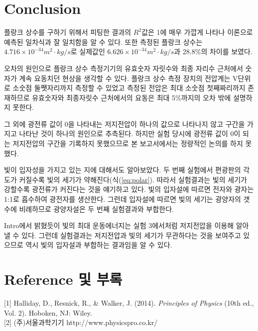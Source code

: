 \documentclass[a4paper]{article}
\begin{document}
	\section{Conclusion}
	플랑크 상수를 구하기 위해서 피팅한 결과의 $R^2$값은 1에 매우 가깝게 나타나 이론으로 예측된 일차식과 잘 일치함을 알 수 있다.
	또한 측정된 플랑크 상수는 $4.716 \times 10^{-34} \si{m^2 \cdot kg /s}$로 실제값인 $6.626 \times 10^{-34} \si{m^2 \cdot kg /s}$과 28.8\%의 차이를 보였다. 

	오차의 원인으로 플랑크 상수 측정기기의 유효숫자 자릿수와 최종 자리수 근처에서 숫자가 계속 요동치던 현상을 생각할 수 있다.
	플랑크 상수 측정 장치의 전압계는 V단위로 소숫점 둘쨋자리까지 측정할 수 있었고 측정된 전압은 최대 소숫점 첫째짜리까지 존재하므로 유효숫자와 최종자릿수 근처에서의 요동은 최대 5\%까지의 오차 밖에 설명하지 못한다.

	그 외에 광전류 값이 0을 나타내는 저지전압이 하나의 값으로 나타나지 않고 구간을 가지고 나타난 것이 하나의 원인으로 추측된다.
	하지만 실험 당시에 광전류 값이 0이 되는 저지전압의 구간을 기록하지 못했으므로 본 보고서에서는 정량적인 논의를 하지 못했다.

	빛이 입자성을 가지고 있는 지에 대해서도 알아보았다.
	두 번째 실험에서 편광판의 각도가 커질수록 빛의 세기가 약해진다(식(\ref{eq:polar}).
	따라서 실험결과는 빛의 세기가 강할수록 광전류가 커진다는 것을 얘기하고 있다.
	빛의 입자설에 따르면 전자와 광자는 1:1로 흡수하여 광전자를 생산한다.
	그런데 입자설에 따르면 빛의 세기는 광양자의 갯수에 비례하므로 광양자설은 두 번째 실험결과와 부합한다.

	Intro에서 밝혔듯이 빛의 최대 운동에너지는 실험 3에서처럼 저지전압을 이용해 알아낼 수 있다.
	그런데 실험결과는 저지전압과 빛의 세기가 무관하다는 것을 보여주고 있으므로 역시 빛의 입자설과 부합하는 결과임을 알 수 있다. 
	

\section{Reference 및 부록}
	[1] Halliday, D., Resnick, R., \& Walker, J. (2014). {\it{}Principles of Physics} (10th ed., Vol. 2). Hoboken, NJ: Wiley. \\
	{[2]} (주)서울과학기기 http://www.physicspro.co.kr/
\end{document}
